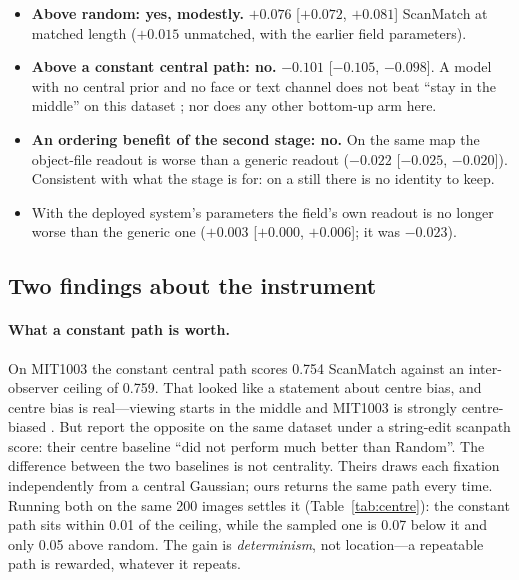 \documentclass[11pt,a4paper]{article}
\begin{document}
\begin{itemize}
  \item \textbf{Above random: yes, modestly.} $+0.076$ [$+0.072$, $+0.081$]
        ScanMatch at matched length ($+0.015$ unmatched, with the earlier field
        parameters).
  \item \textbf{Above a constant central path: no.} $-0.101$ [$-0.105$,
        $-0.098$]. A model with no central prior and no face or text channel does
        not beat ``stay in the middle'' on this dataset \citep{tatler2007}; nor
        does any other bottom-up arm here.
  \item \textbf{An ordering benefit of the second stage: no.} On the same map the
        object-file readout is worse than a generic readout ($-0.022$
        [$-0.025$, $-0.020]$). Consistent with what the stage is for: on a still
        there is no identity to keep.
  \item With the deployed system's parameters the field's own readout is no
        longer worse than the generic one ($+0.003$ [$+0.000$, $+0.006$]; it was
        $-0.023$).
\end{itemize}

\subsection{Two findings about the instrument}
\label{sec:instrument}

\paragraph{What a constant path is worth.} On MIT1003 the constant central path
scores 0.754 ScanMatch against an inter-observer ceiling of 0.759. That looked
like a statement about centre bias, and centre bias is real---viewing starts in
the middle and MIT1003 is strongly centre-biased \citep{tatler2007}. But
\citet{schwinn2022} report the opposite on the same dataset under a string-edit
scanpath score: their centre baseline ``did not perform much better than
Random''. The difference between the two baselines is not centrality. Theirs
draws each fixation independently from a central Gaussian; ours returns the same
path every time. Running both on the same 200 images settles it
(Table~\ref{tab:centre}): the constant path sits within 0.01 of the ceiling,
while the sampled one is 0.07 below it and only 0.05 above random. The gain is
\emph{determinism}, not location---a repeatable path is rewarded, whatever it
repeats.
\end{document}
